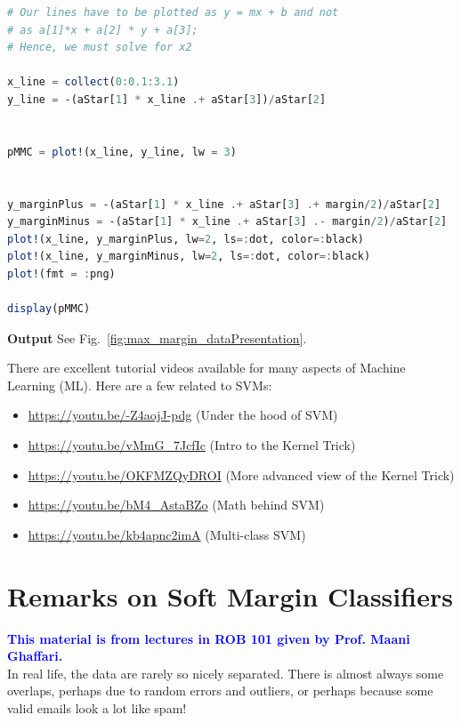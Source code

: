 \begin{lstlisting}[language=Julia,style=mystyle]
# Our lines have to be plotted as y = mx + b and not 
# as a[1]*x + a[2] * y + a[3]; 
# Hence, we must solve for x2

x_line = collect(0:0.1:3.1)
y_line = -(aStar[1] * x_line .+ aStar[3])/aStar[2]


pMMC = plot!(x_line, y_line, lw = 3)


y_marginPlus = -(aStar[1] * x_line .+ aStar[3] .+ margin/2)/aStar[2]
y_marginMinus = -(aStar[1] * x_line .+ aStar[3] .- margin/2)/aStar[2]
plot!(x_line, y_marginPlus, lw=2, ls=:dot, color=:black)
plot!(x_line, y_marginMinus, lw=2, ls=:dot, color=:black)
plot!(fmt = :png)

display(pMMC)
\end{lstlisting}
\textbf{Output} 
See Fig.~\ref{fig:max_margin_dataPresentation}.

\begin{tcolorbox}[title={\bf Now that you are warmed up ...}]
There are excellent tutorial videos available for many aspects of Machine Learning (ML). Here are a few related to SVMs:

\begin{itemize}
    \item \url{https://youtu.be/-Z4aojJ-pdg} (Under the hood of SVM)

    \item \url{https://youtu.be/vMmG_7JcfIc} (Intro to the Kernel Trick)

    \item \url{https://youtu.be/OKFMZQyDROI} (More advanced view of the Kernel Trick)

    \item \url{https://youtu.be/bM4_AstaBZo} (Math behind SVM)

    \item \url{https://youtu.be/kb4apnc2imA} (Multi-class SVM)
\end{itemize}
    
\end{tcolorbox}


\section{Remarks on Soft Margin Classifiers} 

\textcolor{blue}{\bf This material is from lectures in ROB 101 given by Prof. Maani Ghaffari.}\\

In real life, the data are rarely so nicely separated. There is almost always some overlaps, perhaps due to random errors and outliers, or perhaps because some valid emails look a lot like spam! 


